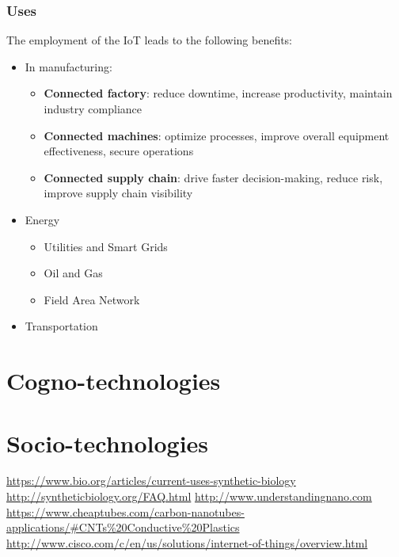 \documentclass{beamer}
\begin{document}
\begin{frame}
	\frametitle{Uses}
	The employment of the IoT leads to the following benefits:
	\begin{itemize}
		\item In manufacturing:
		\begin{itemize}
			\item\textbf{Connected factory}: reduce downtime, increase productivity, maintain industry compliance
			\item \textbf{Connected machines}: optimize processes, improve overall equipment effectiveness, secure operations
			\item \textbf{Connected supply chain}: drive faster decision-making, reduce risk, improve supply chain visibility
		\end{itemize}
	\item Energy
	\begin{itemize}
		\item Utilities and Smart Grids
		\item Oil and Gas
		\item Field Area Network
	\end{itemize}
\item Transportation
	\end{itemize}
\end{frame}


\section{Cogno-technologies}

\section{Socio-technologies}

\begin{thebibliography}{0}
	\url{https://www.bio.org/articles/current-uses-synthetic-biology}
	\url{http://syntheticbiology.org/FAQ.html}
	\url{http://www.understandingnano.com}
	\url{https://www.cheaptubes.com/carbon-nanotubes-applications/#CNTs%20Conductive%20Plastics}
	\url{http://www.cisco.com/c/en/us/solutions/internet-of-things/overview.html}
\end{thebibliography}
\end{document}
